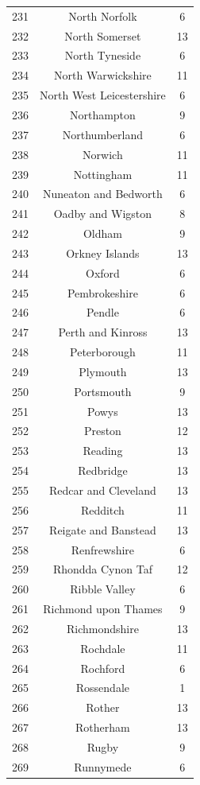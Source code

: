 \documentclass[Royal,times,sageh]{sagej}
\begin{document}
\begin{table}[!htbp]
\begin{tabular}{@{\extracolsep{5pt}} ccc}
231 & North Norfolk & 6 \\ 
232 & North Somerset & 13 \\ 
233 & North Tyneside & 6 \\ 
234 & North Warwickshire & 11 \\ 
235 & North West Leicestershire & 6 \\ 
236 & Northampton & 9 \\ 
237 & Northumberland & 6 \\ 
238 & Norwich & 11 \\ 
239 & Nottingham & 11 \\ 
240 & Nuneaton and Bedworth & 6 \\ 
241 & Oadby and Wigston & 8 \\ 
242 & Oldham & 9 \\ 
243 & Orkney Islands & 13 \\ 
244 & Oxford & 6 \\ 
245 & Pembrokeshire & 6 \\ 
246 & Pendle & 6 \\ 
247 & Perth and Kinross & 13 \\ 
248 & Peterborough & 11 \\ 
249 & Plymouth & 13 \\ 
250 & Portsmouth & 9 \\ 
251 & Powys & 13 \\ 
252 & Preston & 12 \\ 
253 & Reading & 13 \\ 
254 & Redbridge & 13 \\ 
255 & Redcar and Cleveland & 13 \\ 
256 & Redditch & 11 \\ 
257 & Reigate and Banstead & 13 \\ 
258 & Renfrewshire & 6 \\ 
259 & Rhondda Cynon Taf & 12 \\ 
260 & Ribble Valley & 6 \\ 
261 & Richmond upon Thames & 9 \\ 
262 & Richmondshire & 13 \\ 
263 & Rochdale & 11 \\ 
264 & Rochford & 6 \\ 
265 & Rossendale & 1 \\ 
266 & Rother & 13 \\ 
267 & Rotherham & 13 \\ 
268 & Rugby & 9 \\ 
269 & Runnymede & 6 \\ 

\end{tabular}
\end{table}
\end{document}
